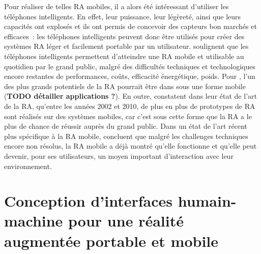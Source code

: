 Pour réaliser de telles RA mobiles, il a alors été intéressant d'utiliser les téléphones intelligents. En effet, leur puissance, leur légèreté, ainsi que leurs capacités ont explosés et ils ont permis de concevoir des capteurs bon marchés et efficaces~: les téléphones intelligents peuvent donc être utilisés pour créer des systèmes RA léger et facilement portable par un utilisateur. \citep{DeSaChurchill2013} \citet{VanKrevelenPoelman2010} soulignent que les téléphones intelligents permettent d'atteindre une RA mobile et utilisable au quotidien par le grand public, malgré des difficultés techniques et technologiques encore restantes de performances, coûts, efficacité énergétique, poids. Pour \citeauthor{VanKrevelenPoelman2010}, l'un des plus grands potentiels de la RA pourrait être dans sous une forme mobile (\textbf{TODO détailler applications ?}). En outre, \citet{CarmignianiFurhtAnisettiEtAl2011} constatent dans leur état de l'art de la RA, qu'entre les années 2002 et 2010, de plus en plus de prototypes de RA sont réalisés sur des systèmes mobiles, car c'est sous cette forme que la RA a le plus de chance de réussir auprès du grand public. Dans un état de l'art récent plus spécifique à la RA mobile, \citet{HuangHuiPeyloEtAl2013} concluent que malgré les challenges techniques encore non résolus, la RA mobile a déjà montré qu'elle fonctionne et qu'elle peut devenir, pour ses utilisateurs, un moyen important d’interaction avec leur environnement.


\section*{Conception d'interfaces humain-machine pour une réalité augmentée portable et mobile}
\subsection*{}
\cite{DeSaChurchill2013}

